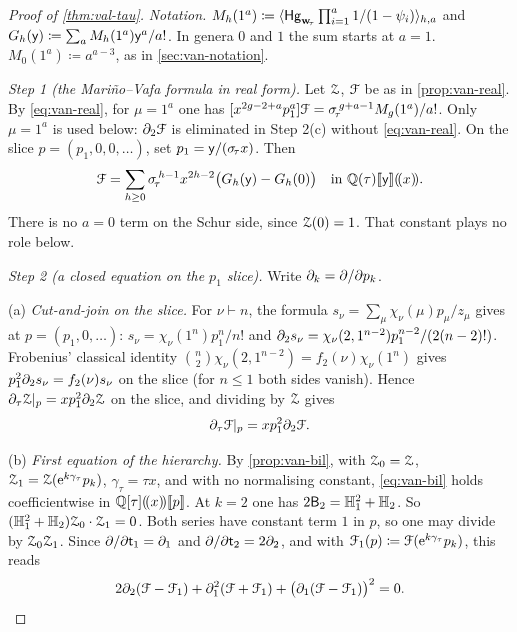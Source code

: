 \begin{proof}[Proof of \cref{thm:val-tau}]
\emph{Notation.} $M_h(1^a)\coloneqq\langle\mathsf{Hg}_{\mathbf{w}_{\!\tau}}\prod_{i=1}^a1/(1-\psi_i)\rangle_{h,a}$ and $G_h(\mathsf{y})\coloneqq\sum_aM_h(1^a)\mathsf{y}^a/a!$. In genera $0$ and $1$ the sum starts at $a=1$. $M_0(1^a)\coloneqq a^{a-3}$, as in \cref{sec:van-notation}.

\emph{Step 1 (the Mari\~no--Vafa formula in real form).} Let $\mathcal{Z}$, $\mathcal{F}$ be as in \cref{prop:van-real}. By \eqref{eq:van-real}, for $\mu=1^a$ one has $[x^{2g-2+a}p_1^a]\mathcal{F}=\sigma_{\!\tau}^{\,g+a-1}M_g(1^a)/a!$. Only $\mu=1^a$ is used below: $\partial_2\mathcal{F}$ is eliminated in Step 2(c) without \eqref{eq:van-real}. On the slice $p=(p_1,0,0,\dots)$, set $p_1=\mathsf{y}/(\sigma_{\!\tau} x)$. Then
\begin{equation}\label{eq:val-slice}
\mathcal{F}=\sum_{h\geq 0}\sigma_{\!\tau}^{\,h-1}x^{2h-2}\bigl(G_h(\mathsf{y})-G_h(0)\bigr)\quad\text{in }\mathbb{Q}(\tau)[\![ \mathsf{y} ]\!](\!(x)\!).
\end{equation}
There is no $a=0$ term on the Schur side, since $\mathcal{Z}(0)=1$. That constant plays no role below.

\emph{Step 2 (a closed equation on the $p_1$ slice).} Write $\partial_k=\partial/\partial p_k$.

(a) \emph{Cut-and-join on the slice.} For $\nu\vdash n$, the formula $s_\nu=\sum_\mu\chi_\nu(\mu)p_\mu/z_\mu$ gives at $p=(p_1,0,\dots)$: $s_\nu=\chi_\nu(1^n)p_1^n/n!$ and $\partial_2s_\nu=\chi_\nu(2,1^{n-2})p_1^{n-2}/(2(n-2)!)$. Frobenius' classical identity $\binom{n}{2}\chi_\nu(2,1^{n-2})=f_2(\nu)\chi_\nu(1^n)$ gives $p_1^2\partial_2s_\nu=f_2(\nu)s_\nu$ on the slice (for $n\leq 1$ both sides vanish). Hence $\partial_\tau\mathcal{Z}|_p=xp_1^2\partial_2\mathcal{Z}$ on the slice, and dividing by $\mathcal{Z}$ gives
\[
\partial_\tau\mathcal{F}|_p=xp_1^2\partial_2\mathcal{F}.
\]

(b) \emph{First equation of the hierarchy.} By \cref{prop:van-bil}, with $\mathcal{Z}_0=\mathcal{Z}$, $\mathcal{Z}_1=\mathcal{Z}(\mathrm{e}^{k\gamma_\tau}p_k)$, $\gamma_\tau=\tau x$, and with no normalising constant, \eqref{eq:van-bil} holds coefficientwise in $\mathbb{Q}[\tau](\!(x)\!)[\![ p ]\!]$. At $k=2$ one has $2\mathsf{B}_2=\mathbb{H}_1^2+\mathbb{H}_2$. So $(\mathbb{H}_1^2+\mathbb{H}_2)\mathcal{Z}_0\cdot\mathcal{Z}_1=0$. Both series have constant term $1$ in $p$, so one may divide by $\mathcal{Z}_0\mathcal{Z}_1$. Since $\partial/\partial\mathsf{t}_1=\partial_1$ and $\partial/\partial\mathsf{t}_2=2\partial_2$, and with $\mathcal{F}_1(p)\coloneqq\mathcal{F}(\mathrm{e}^{k\gamma_\tau}p_k)$, this reads
\[
2\partial_2(\mathcal{F}-\mathcal{F}_1)+\partial_1^2(\mathcal{F}+\mathcal{F}_1)+\bigl(\partial_1(\mathcal{F}-\mathcal{F}_1)\bigr)^2=0.
\]


\end{proof}

